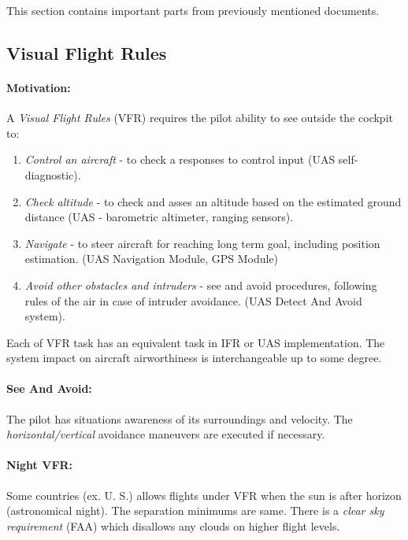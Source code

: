 \begin{note}
    This section contains important parts from previously mentioned documents. 
\end{note}

\subsection{Visual Flight Rules}\label{sec:VisualFlightRules}
\paragraph{Motivation:} A \emph{Visual Flight Rules} (VFR) requires the pilot ability to see outside the cockpit to:

\begin{enumerate}
    \item \emph{Control an aircraft} - to check a responses to control input (UAS self-diagnostic).
    
    \item \emph{Check altitude} - to check and asses an altitude based on the estimated ground distance (UAS - barometric altimeter, ranging sensors).
    
    \item \emph{Navigate} - to steer aircraft for reaching long term goal, including position estimation. (UAS Navigation Module, GPS Module)
    
    \item \emph{Avoid other obstacles and intruders} - see and avoid procedures, following rules of the air in case of intruder avoidance. (UAS Detect And Avoid system).
\end{enumerate}

\begin{note}
    Each of VFR task has an equivalent task in IFR or UAS implementation. The system impact on aircraft airworthiness is interchangeable up to some degree.
\end{note}

\paragraph{See And Avoid:} The pilot has situations awareness of its surroundings and velocity. The \emph{horizontal/vertical} avoidance maneuvers are executed if necessary. 

\paragraph{Night VFR:} Some countries (ex. U. S.) allows flights under VFR when the sun is after horizon (astronomical night). The separation minimums are same. There is a \emph{clear sky requirement} (FAA) which disallows any clouds on higher flight levels.



